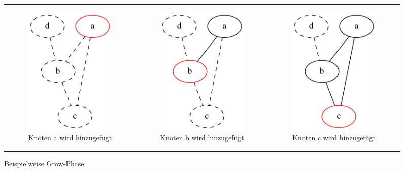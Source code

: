\documentclass[12pt,a4paper,onecolumn,oneside,titlepage]{article}
\begin{document}
	
\begin{figure}
  \centering
  \begin{tabular}[c]{ccc}
    \begin{subfigure}[b]{0.32\textwidth}
      \includegraphics[scale=0.5]{dot/dot_explored_1.png}
     
      \caption{Knoten a wird hinzugefügt}
      \label{fig:algo_explored_1}
   \end{subfigure}&
	 \begin{subfigure}[b]{0.32\textwidth}
	   \includegraphics[scale=0.5]{dot/dot_explored_2.png}
	    \caption{Knoten b wird hinzugefügt}
	    \label{fig:algo_explored_2}
	  \end{subfigure}&
    \begin{subfigure}[b]{0.32\textwidth}
      \includegraphics[scale=0.5]{dot/dot_explored_3.png}
	 
	    \caption{Knoten c wird hinzugefügt}
	    \label{fig:algo_explored_3}
    \end{subfigure}
  \end{tabular}
  \caption{Beispielweise Grow-Phase}\label{fig:algo_explored}
\end{figure}
\end{document}
